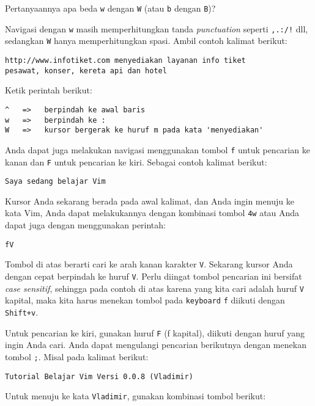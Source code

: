 \documentclass{article}
\begin{document}
Pertanyaannya apa beda \verb=w= dengan \verb=W= (atau
\verb=b= dengan \verb=B=)?

Navigasi dengan \verb=w= masih memperhitungkan tanda
\emph{punctuation} seperti \verb=,.:/!= dll, sedangkan
\verb=W= hanya memperhitungkan spasi. Ambil contoh kalimat
berikut:

\begin{verbatim}
http://www.infotiket.com menyediakan layanan info tiket
pesawat, konser, kereta api dan hotel
\end{verbatim}

Ketik perintah berikut:

\begin{verbatim}
^   =>   berpindah ke awal baris
w   =>   berpindah ke :
W   =>   kursor bergerak ke huruf m pada kata 'menyediakan'
\end{verbatim}

Anda dapat juga melakukan navigasi menggunakan tombol
\verb=f= untuk pencarian ke kanan dan \verb=F= untuk
pencarian ke kiri. Sebagai contoh kalimat berikut:

\begin{verbatim}
Saya sedang belajar Vim
\end{verbatim}

Kursor Anda sekarang berada pada awal kalimat, dan Anda
ingin menuju ke kata Vim, Anda dapat melakukannya dengan
kombinasi tombol \verb=4w= atau Anda dapat juga dengan
menggunakan perintah:

\begin{verbatim}
fV
\end{verbatim}

Tombol di atas berarti cari ke arah kanan karakter \verb=V=.
Sekarang kursor Anda dengan cepat berpindah ke huruf \verb=V=.
Perlu diingat tombol pencarian ini bersifat \emph{case
sensitif}, sehingga pada contoh di atas karena yang kita
cari adalah huruf \verb=V= kapital, maka kita harus menekan tombol
pada \verb=keyboard= \verb=f= diikuti dengan \verb=Shift+v=.

Untuk pencarian ke kiri, gunakan huruf \verb=F= (f kapital),
diikuti dengan huruf yang ingin Anda cari. Anda dapat
mengulangi pencarian berikutnya dengan menekan tombol
\verb=;=. Misal pada kalimat berikut:

\begin{verbatim}
Tutorial Belajar Vim Versi 0.0.8 (Vladimir)
\end{verbatim}

Untuk menuju ke kata \verb=Vladimir=, gunakan kombinasi tombol
berikut:
\end{document}
